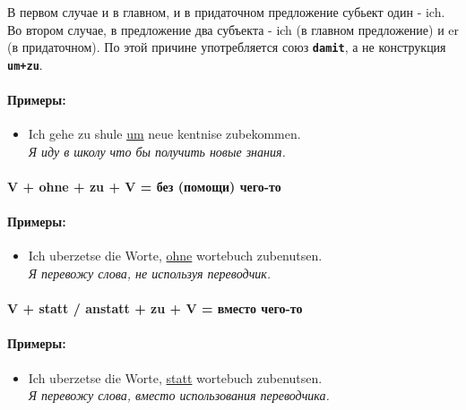 \documentclass[12pt,a4paper]{report}
\newcommand{\term}[1]{\texttt{\textbf{#1}}}
\newcommand{\satzew}[1]{\underline{#1}}
\newcommand{\ubersatze}[1]{\textit{#1}}
\begin{document}
В первом случае и в главном, и в придаточном предложение субьект один - ich. Во втором случае, в предложение два субъекта - ich (в главном предложение) и er (в придаточном). По этой причине употребляется союз \term{damit}, а не конструкция \term{um+zu}. 

\paragraph{Примеры:}
\begin{itemize}
\item Ich gehe zu shule \satzew{um} neue kentnise zubekommen.
~\\ \ubersatze{Я иду в школу что бы получить новые знания.}
\end{itemize}

\paragraph{V + ohne + zu + V = без (помощи) чего-то}

\paragraph{Примеры:}
\begin{itemize}
\item Ich uberzetse die Worte, \satzew{ohne} wortebuch zubenutsen.
~\\ \ubersatze{Я перевожу слова, не используя переводчик.}
\end{itemize}

\paragraph{V + statt / anstatt + zu + V = вместо чего-то}

\paragraph{Примеры:}
\begin{itemize}
\item Ich uberzetse die Worte, \satzew{statt} wortebuch zubenutsen.
~\\ \ubersatze{Я перевожу слова, вместо использования переводчика.}
\end{itemize}
\end{document}
